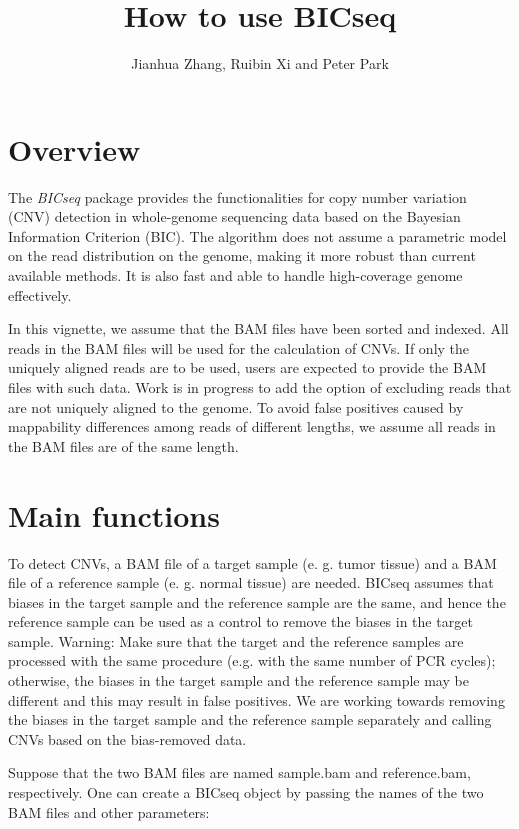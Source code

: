 \documentclass[12pt]{article}
\newcommand{\Rpackage}[1]{{\textit{#1}}}
\begin{document}
\author{Jianhua Zhang, Ruibin Xi and Peter Park}

\title{How to use BICseq}

\maketitle

\section*{Overview}

The \Rpackage{BICseq} package provides the functionalities for copy number variation (CNV) detection
in whole-genome sequencing data based on the Bayesian Information Criterion (BIC). The algorithm does not assume a parametric model on the read 
distribution on the genome, making it more robust than current available 
methods. It is also fast and able to handle high-coverage genome effectively.

In this vignette, we assume that the BAM files have been sorted and indexed. All
reads in the BAM files will be used for the calculation of CNVs.
If only the uniquely aligned reads are to be used, users are expected to provide 
the BAM files with such data. Work is in progress to add the option of excluding
reads that are not uniquely aligned to the genome. To avoid false positives caused 
by mappability differences among reads of different lengths, we assume all reads in 
the BAM files are of the same length.

\section*{Main functions}

To detect CNVs, a BAM file of a target sample (e. g. tumor 
tissue) and a BAM file of a reference sample (e. g. normal tissue) are needed. 
BICseq assumes that biases in the target sample and the reference sample are the same, and hence the reference sample 
can be used as a control to remove the biases in the target sample.
Warning: Make sure that the target and the reference samples are processed with the same procedure (e.g. with the same number of PCR cycles); 
otherwise, the biases in the target sample and the reference sample may be different and this may result in false positives. 
We are working towards removing the biases in the target sample and the reference sample separately and calling CNVs based on the bias-removed data.

Suppose that the two BAM files are named sample.bam and reference.bam, respectively.
One can create a BICseq object by passing the names of the two BAM files and 
other parameters:
\end{document}

